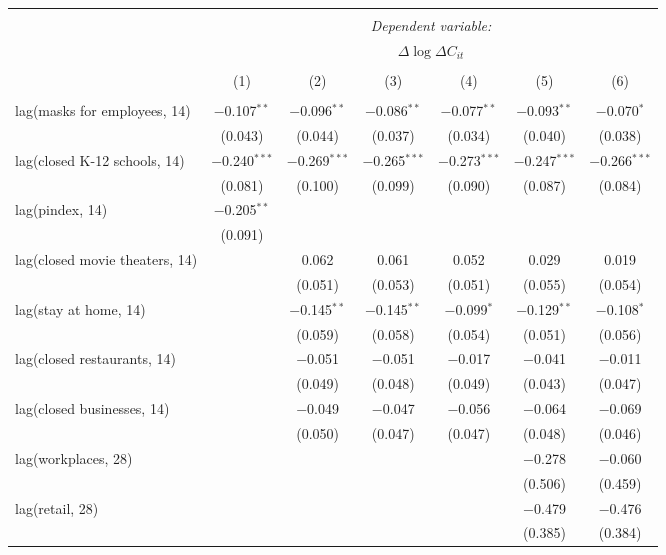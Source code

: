 \begin{tabular}{@{\extracolsep{1pt}}lcccccc} 
\\[-1.8ex]\hline 
\hline \\[-1.8ex] 
 & \multicolumn{6}{c}{\textit{Dependent variable:}} \\ 
\cline{2-7} 
 & \multicolumn{6}{c}{$\Delta \log \Delta C_{it}$} \\ 
\\[-1.8ex] & (1) & (2) & (3) & (4) & (5) & (6)\\ 
\hline \\[-1.8ex] 
 lag(masks for employees, 14) & $-$0.107$^{**}$ & $-$0.096$^{**}$ & $-$0.086$^{**}$ & $-$0.077$^{**}$ & $-$0.093$^{**}$ & $-$0.070$^{*}$ \\ 
  & (0.043) & (0.044) & (0.037) & (0.034) & (0.040) & (0.038) \\ 
  lag(closed K-12 schools, 14) & $-$0.240$^{***}$ & $-$0.269$^{***}$ & $-$0.265$^{***}$ & $-$0.273$^{***}$ & $-$0.247$^{***}$ & $-$0.266$^{***}$ \\ 
  & (0.081) & (0.100) & (0.099) & (0.090) & (0.087) & (0.084) \\ 
  lag(pindex, 14) & $-$0.205$^{**}$ &  &  &  &  &  \\ 
  & (0.091) &  &  &  &  &  \\ 
  lag(closed movie theaters, 14) &  & 0.062 & 0.061 & 0.052 & 0.029 & 0.019 \\ 
  &  & (0.051) & (0.053) & (0.051) & (0.055) & (0.054) \\ 
  lag(stay at home, 14) &  & $-$0.145$^{**}$ & $-$0.145$^{**}$ & $-$0.099$^{*}$ & $-$0.129$^{**}$ & $-$0.108$^{*}$ \\ 
  &  & (0.059) & (0.058) & (0.054) & (0.051) & (0.056) \\ 
  lag(closed restaurants, 14) &  & $-$0.051 & $-$0.051 & $-$0.017 & $-$0.041 & $-$0.011 \\ 
  &  & (0.049) & (0.048) & (0.049) & (0.043) & (0.047) \\ 
  lag(closed businesses, 14) &  & $-$0.049 & $-$0.047 & $-$0.056 & $-$0.064 & $-$0.069 \\ 
  &  & (0.050) & (0.047) & (0.047) & (0.048) & (0.046) \\ 
  lag(workplaces, 28) &  &  &  &  & $-$0.278 & $-$0.060 \\ 
  &  &  &  &  & (0.506) & (0.459) \\ 
  lag(retail, 28) &  &  &  &  & $-$0.479 & $-$0.476 \\ 
  &  &  &  &  & (0.385) & (0.384) \\ 

\end{tabular}
